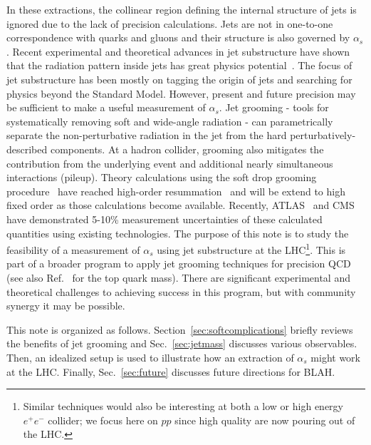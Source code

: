 In these extractions, the collinear region defining the internal structure of jets is ignored due to the lack of precision calculations.  Jets are not in one-to-one correspondence with quarks and gluons and their structure is also governed by $\alpha_s$.  Recent experimental and theoretical advances in jet substructure have shown that the radiation pattern inside jets has great physics potential~\cite{Abdesselam:2010pt,Altheimer:2012mn,Altheimer:2013yza,Adams:2015hiv,Larkoski:2017jix}.  The focus of jet substructure has been mostly on tagging the origin of jets and searching for physics beyond the Standard Model.  However, present and future precision may be sufficient to make a useful measurement of $\alpha_s$.  Jet grooming - tools for systematically removing soft and wide-angle radiation - can parametrically separate the non-perturbative radiation in the jet from the hard perturbatively-described components.  At a hadron collider, grooming also mitigates the contribution from the underlying event and additional nearly simultaneous interactions (pileup).  Theory calculations using the soft drop grooming procedure~\cite{Larkoski:2014wba} have reached high-order resummation~\cite{Marzani:2017kqd,Marzani:2017mva,Frye:2016aiz,Frye:2016okc} and will be extend to high fixed order as those calculations become available.  Recently, ATLAS~\cite{Aaboud:2017qwh} and CMS~\cite{CMS-PAS-SMP-16-010} have demonstrated 5-10\% measurement uncertainties of these calculated quantities using existing technologies.   The purpose of this note is to study the feasibility of a measurement of $\alpha_s$ using jet substructure at the LHC\footnote{Similar techniques would also be interesting at both a low or high energy $e^+e^-$ collider; we focus here on $pp$ since high quality are now pouring out of the LHC.}.  This is part of a broader program to apply jet grooming techniques for precision QCD (see also Ref.~\cite{Hoang:2017kmk} for the top quark mass).  There are significant experimental and theoretical challenges to achieving success in this program, but with community synergy it may be possible.

This note is organized as follows.  Section~\ref{sec:softcomplications} briefly reviews the benefits of jet grooming and Sec.~\ref{sec:jetmass} discusses various observables.  Then, an idealized setup is used to illustrate how an extraction of $\alpha_s$ might work at the LHC.  Finally, Sec.~\ref{sec:future} discusses future directions for BLAH.

\begin{comment}
\begin{itemize}
\item Laying the groundwork for high precision ($\mathcal{O}(1\%)$) extractions of $\alpha_s$ for the full LHC dataset or a future $e^+e^-$ machine.
\item Competitive measurements with existing LHC extractions of $\alpha_s$ (5\%)
\item Probing the tension between thrust (and friends) extractions with lattice (10\%)
\item Parton shower MC (15\%)
\end{itemize}
\end{comment}


